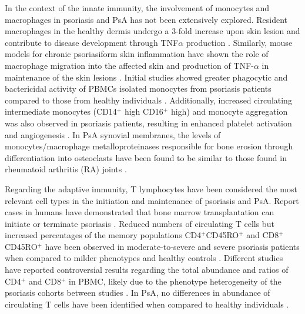 In the context of the innate immunity, the involvement of monocytes and macrophages in psoriasis and PsA has not been extensively explored. Resident macrophages in the healthy dermis undergo a 3-fold increase upon skin lesion and contribute to disease development through TNF$\alpha$ production \parencite{Perera2012, Mahil2016}. Similarly, mouse models for chronic psoriasiform skin inflammation have shown the role of macrophage migration into the affected skin and production of TNF-$\alpha$ in maintenance of the skin lesions \parencite{Stratis2006, Wang2006}. Initial studies showed greater phagocytic and bactericidal activity of PBMCs isolated monocytes from psoriasis patients compared to those from healthy individuals \parencite{Bar-Eli1979}. Additionally, increased circulating intermediate monocytes (CD14$^+$ high CD16$^+$ high) and monocyte aggregation was also observed in psoriasis patients, resulting in enhanced platelet activation and angiogenesis \parencite {Golden2015}. In PsA synovial membranes, the levels of monocytes/macrophage metalloproteinases responsible for bone erosion through differentiation into osteoclasts  have been found to be similar to those  found in rheumatoid arthritis (RA) joints \parencite{Hitchon2002}. 

Regarding the adaptive immunity, T lymphocytes have been considered the most relevant cell types in the initiation and maintenance of psoriasis and PsA. Report cases in humans have demonstrated that bone marrow transplantation can initiate or terminate psoriasis \parencite{Eedy1990, Gardembas1990}. Reduced numbers of circulating T cells but increased percentages of the memory populations CD4$^+$CD45RO$^+$ and CD8$^+$CD45RO$^+$ have been observed in moderate-to-severe and severe psoriasis patients when compared to milder phenotypes and healthy controls \parencite{Lecewicz-Toruń2001,Langewouters2008}. Different studies have reported controversial results regarding the total abundance and ratios of CD4$^+$ and CD8$^{+}$ in PBMC, likely due to the phenotype heterogeneity of the psoriasis cohorts between studies \parencite{Lecewicz-Toruń2001,Cameron2003,Langewouters2008}. In PsA, no differences in abundance of circulating T cells have been identified when compared to healthy individuals \parencite{Costello1999}.

